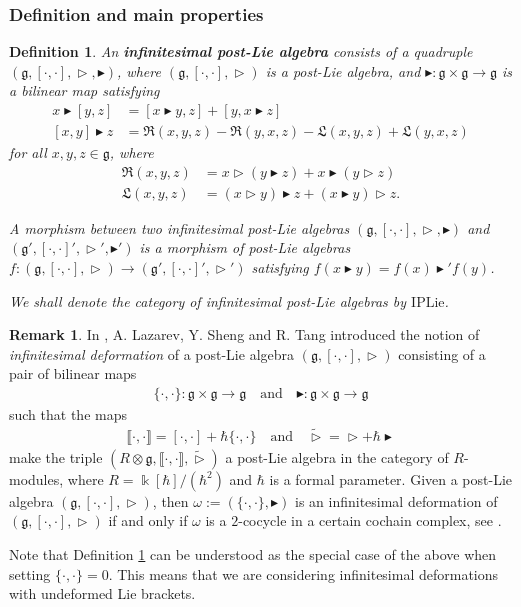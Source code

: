 \documentclass[10pt]{article}
\newtheorem {definition}[lemma] {Definition}
\theoremstyle{definition}
\newtheorem{remark}[lemma]{Remark}
\newcommand{\g}{\mathfrak{g}}
\newcommand{\wt}{\vartriangleright}
\newcommand{\bt}{\blacktriangleright}
\newcommand{\R}{\mathfrak{R}}
\renewcommand{\L}{\mathfrak{L}}
\newcommand{\ten}{\otimes}
\begin{document}
\subsubsection{Definition and main properties}
\begin{definition}\label{def:infinitesimalPostLie}
An \textbf{infinitesimal post-Lie algebra} consists of a quadruple $(\g,[\cdot,\cdot], \wt,\bt)$, where $(\g,[\cdot,\cdot],\wt)$ is a post-Lie algebra, and $\bt: \g \times \g \to \g$ is a bilinear map satisfying
\begin{align}
x \bt [y,z] &= [x \bt y,z] + [y,x \bt z] \label{eq:infpostlie:1}\\
[x,y] \bt z &= \R(x,y,z) - \R(y,x,z) - \L(x,y,z) + \L(y,x,z) \label{eq:infpostlie:2}
\end{align}
for all $x,y,z \in \g$, where 
\begin{align*}
\R(x,y,z) &= x \wt (y \bt z) + x \bt (y \wt z)\\
\L(x,y,z) &= (x \wt y) \bt z + (x \bt y) \wt z.
\end{align*}

A morphism between two infinitesimal post-Lie algebras $(\g,[\cdot,\cdot], \wt,\bt)$ and  $(\g',[\cdot,\cdot]', \wt',\bt')$ is a morphism of post-Lie algebras $f: (\g,[\cdot,\cdot],\wt) \to (\g',[\cdot,\cdot]',\wt')$ satisfying $f(x \bt y) = f(x) \bt' f(y)$. 

We shall denote the category of infinitesimal post-Lie algebras by $\mathrm{IPLie}$.
\end{definition}

\begin{remark}\label{def-inf-deformation}
In \cite[Definition 3.12]{LazST}, A. Lazarev, Y. Sheng and R. Tang introduced the notion of \textit{infinitesimal deformation} of a post-Lie algebra $(\g,[\cdot,\cdot],\wt)$ consisting of a pair of bilinear maps
\begin{align*}
\{ \cdot,\cdot\} : \g \times \g \to \g \quad \text{and} \quad \bt: \g \times \g \to \g
\end{align*}
such that the maps
\begin{align*}
\llbracket \cdot,\cdot \rrbracket = [\cdot,\cdot] + \hbar \{\cdot,\cdot\}  \quad \text{and} \quad  \widetilde{\wt} = \wt + \hbar \bt 
\end{align*}
make the triple $( R \ten \g, \llbracket \cdot,\cdot \rrbracket , \widetilde{\wt}) $ a post-Lie algebra in the category of $R$-modules, where $R= \Bbbk[\hbar]/(\hbar^2)$ and $\hbar$ is a formal parameter. Given a post-Lie algebra $(\g,[\cdot,\cdot],\wt)$, then $\omega:= (\{\cdot,\cdot\},\bt)$ is an infinitesimal deformation of $(\g,[\cdot,\cdot],\wt)$ if and only if $\omega$ is a $2$-cocycle in a certain cochain complex, see \cite[Theorem 3.13]{LazST}.

Note that Definition \ref{def:infinitesimalPostLie} can be understood as the special case of the above when setting $\{\cdot,\cdot\}=0$. This means that we are considering infinitesimal deformations with undeformed Lie brackets.
\end{remark}
\end{document}
